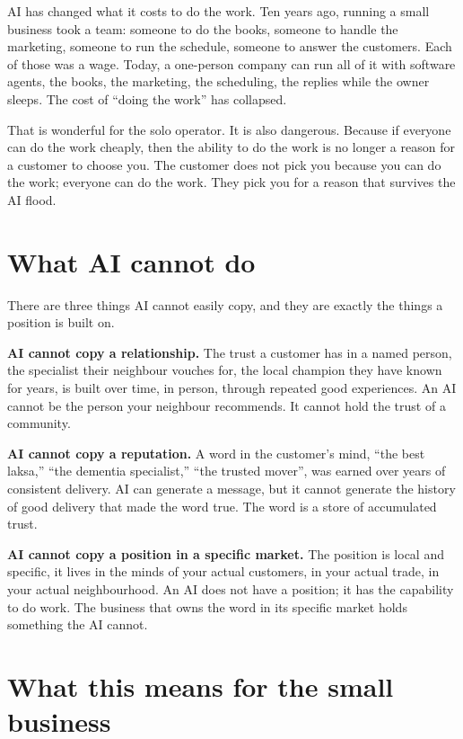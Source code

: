 \documentclass[10pt,twoside,openany]{memoir}
\newcommand{\needspacehead}{\needspace{4\baselineskip}}
\let\oldsection\section
\renewcommand{\section}{\needspacehead\oldsection}
\begin{document}
{AI has changed what it costs to do the work. Ten years ago, running a
small business took a team: someone to do the books, someone to handle
the marketing, someone to run the schedule, someone to answer the
customers. Each of those was a wage. Today, a one-person company can run
all of it with software agents, the books, the marketing, the
scheduling, the replies while the owner sleeps. The cost of ``doing the
work'' has collapsed.

That is wonderful for the solo operator. It is also dangerous. Because
if everyone can do the work cheaply, then the ability to do the work is
no longer a reason for a customer to choose you. The customer does not
pick you because you can do the work; everyone can do the work. They
pick you for a reason that survives the AI flood.

\section{What AI cannot do}\label{what-ai-cannot-do}

There are three things AI cannot easily copy, and they are exactly the
things a position is built on.

\textbf{AI cannot copy a relationship.} The trust a customer has in a
named person, the specialist their neighbour vouches for, the local
champion they have known for years, is built over time, in person,
through repeated good experiences. An AI cannot be the person your
neighbour recommends. It cannot hold the trust of a community.

\textbf{AI cannot copy a reputation.} A word in the customer's mind,
``the best laksa,'' ``the dementia specialist,'' ``the trusted mover'',
was earned over years of consistent delivery. AI can generate a message,
but it cannot generate the history of good delivery that made the word
true. The word is a store of accumulated trust.

\textbf{AI cannot copy a position in a specific market.} The position is
local and specific, it lives in the minds of your actual customers, in
your actual trade, in your actual neighbourhood. An AI does not have a
position; it has the capability to do work. The business that owns the
word in its specific market holds something the AI cannot.

\section{What this means for the small
business}\label{what-this-means-for-the-small-business}

}
\end{document}
